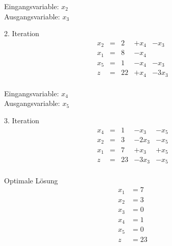 \documentclass[a4paper]{scrartcl}
\begin{document}
\begin{enumerate}
\begin{enumerate}
\begin{enumerate}[(i)]
\begin{enumerate}
                                Eingangsvariable: $x_2$ \\
                                Ausgangsvariable: $x_3$

                                2. Iteration
                                \begin{equation}
                                    \begin{array}{rcrrr}
                                        x_2 & = & 2 & +x_4 & -x_3 \\
                                        x_1 & = & 8 & -x_4 &  \\
                                        x_5 & = & 1 & -x_4 & -x_3 \\
                                        \hline
                                        z   & = & 22 & +x_4 & -3x_3 \\
                                    \end{array}
                                \end{equation}

                                Eingangsvariable: $x_4$ \\
                                Ausgangsvariable: $x_5$

                                3. Iteration
                                \begin{equation}
                                    \begin{array}{rcrrr}
                                        x_4 & = & 1 & -x_3 & -x_5 \\
                                        x_2 & = & 3 & -2x_3 & -x_5 \\
                                        x_1 & = & 7 & +x_3 & +x_5 \\
                                        \hline
                                        z   & = & 23 & -3x_3 & -x_5 \\
                                    \end{array}
                                \end{equation}

                                Optimale Lösung
                                \begin{align*}
                                    x_1 &= 7 \\
                                    x_2 &= 3 \\
                                    x_3 &= 0 \\
                                    x_4 &= 1 \\
                                    x_5 &= 0 \\
                                    z   &= 23
                                \end{align*}


\end{enumerate}
\end{enumerate}
\end{enumerate}
\end{enumerate}
\end{document}
